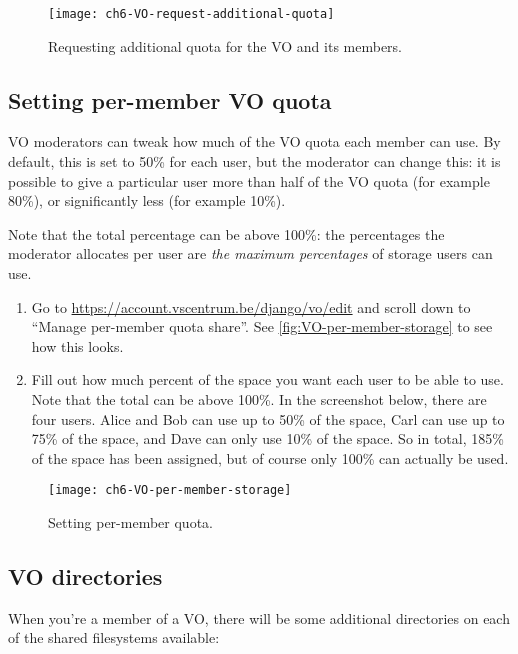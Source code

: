 \begin{figure}[!htbp]
  \caption{Requesting additional quota for the VO and its members.}
  \centering
    \texttt{[image: ch6-VO-request-additional-quota]}
\end{figure}\label{fig:VO-request-additional-quota}

\subsection{Setting per-member VO quota}

VO moderators can tweak how much of the VO quota each member can use. By default,
this is set to 50\% for each user, but the moderator can change this: it is possible
to give a particular user more than half of the VO quota (for example 80\%), or
significantly less (for example 10\%).

Note that the total percentage can be above 100\%: the percentages the moderator
allocates per user are \emph{the maximum percentages} of storage users can use.

\begin{enumerate}
    \item Go to \url{https://account.vscentrum.be/django/vo/edit} and scroll down
        to ``Manage per-member quota share''. See \autoref{fig:VO-per-member-storage} to see how this looks.
    \item Fill out how much percent of the space you want each user to be able to use.
        Note that the total can be above 100\%. In the screenshot below, there are
        four users. Alice and Bob can use up to 50\% of the space, Carl
        can use up to 75\% of the space, and Dave can only use 10\% of the space.
        So in total, 185\% of the space has been assigned, but of course only
        100\% can actually be used.
\end{enumerate}

\begin{figure}[!htbp]
  \caption{Setting per-member quota.}
  \centering
    \texttt{[image: ch6-VO-per-member-storage]}
\end{figure}\label{fig:VO-per-member-storage}

\subsection{VO directories}
\label{subsec:vo-directories}

When you're a member of a VO, there will be some additional directories
on each of the shared filesystems available:

